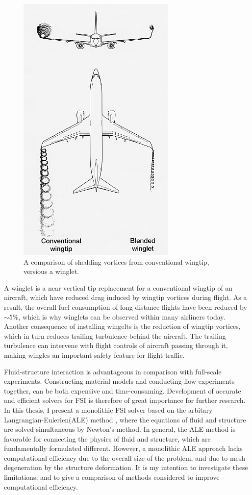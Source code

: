 \begin{figure}
\includegraphics[scale=0.5]{./Fig/winglet.png}
  \caption{A comparison of shedding vortices from conventional wingtip, versious a winglet.}
  \vspace{-120pt} 
\end{figure}
A winglet is a near vertical tip replacement for a conventional wingtip of an aircraft, which have reduced drag induced by wingtip vortices during flight. As a result, the overall fuel consumption of long-distance flights have been reduced by $\sim 5 \%$, which is why winglets can be observed within many airliners today. Another consequence of installing wingelts is the reduction of wingtip vortices, which in turn reduces trailing turbulence behind the aircraft.  The trailing turbulence can intervene with flight controls of aircraft passing through it, making  wingles an important safety feature for flight traffic.



\newpage

Fluid-structure interaction is advantageous in comparison with full-scale experiments. Constructing material models and conducting flow experiments together, can be both expensive and time-consuming. Development of accurate and efficient solvers for FSI is therefore of great importance for further research. In this thesis, I present a monolithic FSI solver based on the arbitary Langrangian-Eulerien(ALE) method \cite{Donea2004}, where the equations of fluid and structure are solved simultaneous by Newton's method. In general, the ALE method is favorable for connecting the physics of fluid and structure, which are fundamentally formulated different. However, a monolithic ALE approach lacks computational efficiency due to the overall size of the problem, and due to mesh degeneration by the structure deformation. It is my intention to investigate these limitations, and to give a comparison of methods considered to improve computational efficiency. \\


